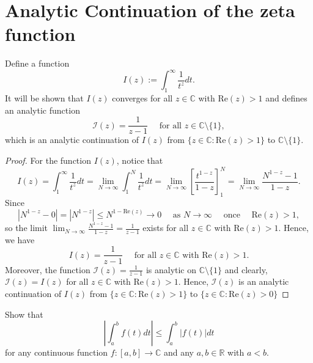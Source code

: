 \documentclass{elegantbook}
\begin{document}
\section{Analytic Continuation of the zeta function}

\begin{lemma} \label{lem:analytic_continuation_of_a_simple_integral_function}
  Define a function
  \[
    I(z) := \int_{1}^{\infty} \frac{1}{t^z} dt.
  \]
  It will be shown that $I(z)$ converges for all $z\in\mathbb{C}$ with $\mathrm{Re}(z) > 1$ and defines an analytic function
  \[
    \mathcal{I}(z) = \frac{1}{z-1} \quad \text{ for all } z\in\mathbb{C}\setminus\{1\},
  \]
  which is an analytic continuation of $I(z)$ from $\{z\in\mathbb{C} : \mathrm{Re}(z) > 1\}$ to $\mathbb{C}\setminus\{1\}$.
\end{lemma}

\begin{proof}
  For the function $I(z)$, notice that
  \[
    I(z) = \int_{1}^{\infty} \frac{1}{t^z} dt = \lim_{N\to\infty} \int_{1}^{N} \frac{1}{t^z} dt = \lim_{N\to\infty} \left[ \frac{t^{1-z}}{1-z} \right]_{1}^{N} = \lim_{N\to\infty} \frac{N^{1-z}-1}{1-z}.
  \]
  Since
  \[
    |N^{1-z}-0| = |N^{1-z}| \leq N^{1-\mathrm{Re}(z)} \to 0 \quad \text{ as } N \to \infty \quad \text{ once } \quad \mathrm{Re}(z) > 1,
  \]
  so the limit $\lim_{N\to\infty} \frac{N^{1-z}-1}{1-z}= \frac{1}{z-1}$ exists for all $z\in\mathbb{C}$ with $\mathrm{Re}(z) > 1$. Hence, we have
  \[
    I(z) = \frac{1}{z-1} \quad \text{ for all } z\in\mathbb{C} \text{ with } \mathrm{Re}(z) > 1.
  \]
  Moreover, the function $\mathcal{I}(z) = \frac{1}{z-1}$ is analytic on $\mathbb{C}\setminus\{1\}$ and clearly, $\mathcal{I}(z) = I(z)$ for all $z\in\mathbb{C}$ with $\mathrm{Re}(z) > 1$. Hence, $\mathcal{I}(z)$ is an analytic continuation of $I(z)$ from $\{z\in\mathbb{C} : \mathrm{Re}(z) > 1\}$ to $\{z\in\mathbb{C} : \mathrm{Re}(z) > 0\}$
\end{proof}

\begin{exercise} \label{ex:abs_value_of_integral}
  Show that
  \[
    \left|\int_{a}^{b} f(t) dt\right| \leq \int_{a}^{b} |f(t)| dt
  \]
  for any continuous function $f:[a,b]\to\mathbb{C}$ and any $a,b\in\mathbb{R}$ with $a < b$.
\end{exercise}
\end{document}
